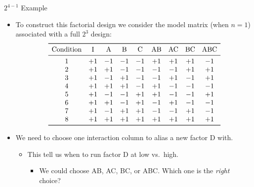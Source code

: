 \begin{Example}{$ 2^{4-1} $ Example}{}
    \begin{itemize}
        \item To construct this factorial design we consider the model matrix (when $n = 1$) associated with a
              full $2^3$ design:
              \[ \begin{array}{ccccccccc}
                      \toprule
                      \text{Condition} & \text{I} & \text{A} & \text{B} & \text{C} & \text{AB} & \text{AC} & \text{BC} & \text{ABC} \\
                      \midrule
                      1                & +1       & -1       & -1       & -1       & +1        & +1        & +1        & -1         \\
                      2                & +1       & +1       & -1       & -1       & -1        & -1        & +1        & +1         \\
                      3                & +1       & -1       & +1       & -1       & -1        & +1        & -1        & +1         \\
                      4                & +1       & +1       & +1       & -1       & +1        & -1        & -1        & -1         \\
                      5                & +1       & -1       & -1       & +1       & +1        & -1        & -1        & +1         \\
                      6                & +1       & +1       & -1       & +1       & -1        & +1        & -1        & -1         \\
                      7                & +1       & -1       & +1       & +1       & -1        & -1        & +1        & -1         \\
                      8                & +1       & +1       & +1       & +1       & +1        & +1        & +1        & +1         \\
                      \bottomrule
                  \end{array} \]
        \item We need to choose one interaction column to alias a new factor D with.
              \begin{itemize}[$\hookrightarrow$]
                  \item This tell us when to run factor D at low vs.\ high.
                        \begin{itemize}
                            \item We could choose AB, AC, BC, or ABC\@. Which one is the \emph{right} choice?

\end{itemize}
\end{itemize}
\end{itemize}
\end{Example}
